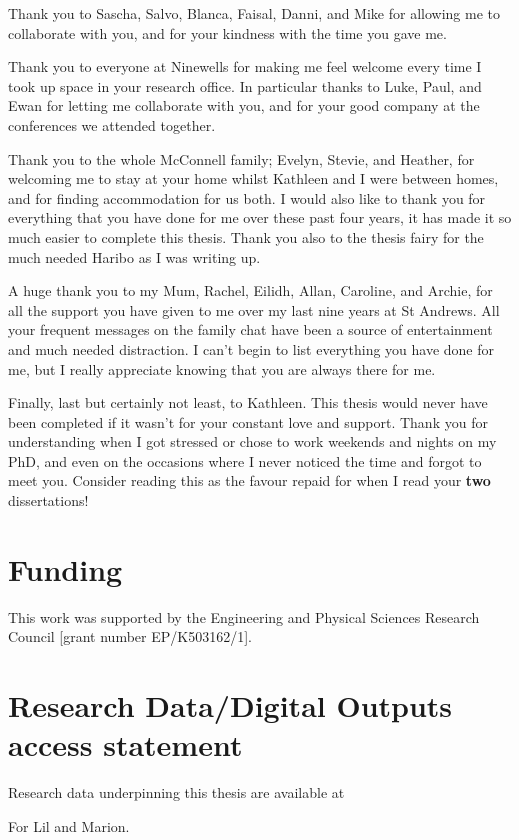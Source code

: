 \documentclass[10pt,a4paper,twoside]{book}
\begin{document}
Thank you to Sascha, Salvo, Blanca, Faisal, Danni, and Mike for allowing me to collaborate with you, and for your kindness with the time you gave me.
\medskip

Thank you to everyone at Ninewells for making me feel welcome every time I took up space in your research office.
In particular thanks to Luke, Paul, and Ewan for letting me collaborate with you, and for your good company at the conferences we attended together.
\medskip

Thank you to the whole McConnell family; Evelyn, Stevie, and Heather, for welcoming me to stay at your home whilst Kathleen and I were between homes, and for finding accommodation for us both.
I would also like to thank you for everything that you have done for me over these past four years, it has made it so much easier to complete this thesis.
Thank you also to the thesis fairy for the much needed Haribo as I was writing up.
\medskip

A huge thank you to my Mum, Rachel, Eilidh, Allan, Caroline, and Archie, for all the support you have given to me over my last nine years at St Andrews.
All your frequent messages on the family chat have been a source of entertainment and much needed distraction.
I can't begin to list everything you have done for me, but I really appreciate knowing that you are always there for me.
\medskip

Finally, last but certainly not least, to Kathleen.
This thesis would never have been completed if it wasn't for your constant love and support.
Thank you for understanding when I got stressed or chose to work weekends and nights on my PhD, and even on the occasions where I never noticed the time and forgot to meet you.
\noindent Consider reading this as the favour repaid for when I read your \textbf{two} dissertations!

\newpage
\section*{Funding}

This work was supported by the Engineering and Physical Sciences Research Council [grant number EP/K503162/1].

\section*{Research Data/Digital Outputs access statement}


Research data underpinning this thesis are available at 
\null\newpage
\null\newpage
\null\newpage
\begin{center}
    \vspace*{\fill}
    For Lil and Marion.
    \vspace*{\fill}
\end{center}
\clearpage
\null\newpage
\end{document}

